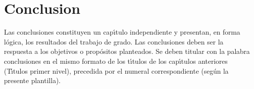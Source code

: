 \chapter{Conclusion}
Las conclusiones constituyen un cap\'{\i}tulo independiente y presentan, en forma l\'{o}gica, los resultados del trabajo de grado. Las conclusiones deben ser la respuesta a los objetivos o prop\'{o}sitos planteados. Se deben titular con la palabra conclusiones en el mismo formato de los t\'{\i}tulos de los cap\'{\i}tulos anteriores (T\'{\i}tulos primer nivel), precedida por el numeral correspondiente (seg\'{u}n la presente plantilla).


